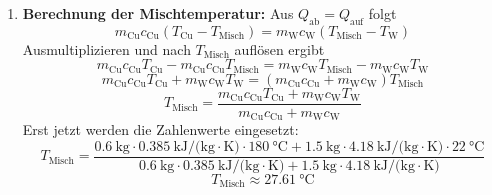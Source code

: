 \documentclass[11pt, a4paper]{article}
\begin{document}
\begin{enumerate}
    \item \textbf{Berechnung der Mischtemperatur:}
    Aus $Q_{\text{ab}} = Q_{\text{auf}}$ folgt
    \[
        m_{\text{Cu}} c_{\text{Cu}} (T_{\text{Cu}} - T_{\text{Misch}}) = m_{\text{W}} c_{\text{W}} (T_{\text{Misch}} - T_{\text{W}})
    \]
    Ausmultiplizieren und nach $T_{\text{Misch}}$ auflösen ergibt
    \[
        m_{\text{Cu}} c_{\text{Cu}} T_{\text{Cu}} - m_{\text{Cu}} c_{\text{Cu}} T_{\text{Misch}} = m_{\text{W}} c_{\text{W}} T_{\text{Misch}} - m_{\text{W}} c_{\text{W}} T_{\text{W}}
    \]
    \[
        m_{\text{Cu}} c_{\text{Cu}} T_{\text{Cu}} + m_{\text{W}} c_{\text{W}} T_{\text{W}} = (m_{\text{Cu}} c_{\text{Cu}} + m_{\text{W}} c_{\text{W}}) T_{\text{Misch}}
    \]
    \[
        T_{\text{Misch}} = \frac{m_{\text{Cu}} c_{\text{Cu}} T_{\text{Cu}} + m_{\text{W}} c_{\text{W}} T_{\text{W}}}{m_{\text{Cu}} c_{\text{Cu}} + m_{\text{W}} c_{\text{W}}}
    \]
    Erst jetzt werden die Zahlenwerte eingesetzt:
    \[
        T_{\text{Misch}} = \frac{\SI{0.6}{\kilogram} \cdot \SI{0.385}{\kilo\joule\per(\kilogram\cdot\kelvin)} \cdot \SI{180}{\degreeCelsius} + \SI{1.5}{\kilogram} \cdot \SI{4.18}{\kilo\joule\per(\kilogram\cdot\kelvin)} \cdot \SI{22}{\degreeCelsius}}{\SI{0.6}{\kilogram} \cdot \SI{0.385}{\kilo\joule\per(\kilogram\cdot\kelvin)} + \SI{1.5}{\kilogram} \cdot \SI{4.18}{\kilo\joule\per(\kilogram\cdot\kelvin)}}
    \]
    \[
        T_{\text{Misch}} \approx \SI{27.61}{\degreeCelsius}
    \]
\end{enumerate}

\newpage
\end{document}
